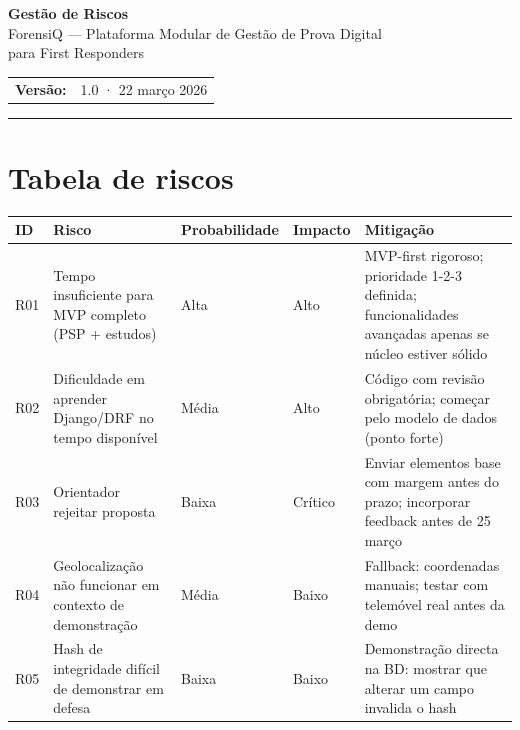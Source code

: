 \documentclass[a4paper,11pt]{article}
\begin{document}

\begin{center}
    {\LARGE\bfseries Gestão de Riscos}\\[0.8em]
    {\large ForensiQ --- Plataforma Modular de Gestão de Prova Digital\\
    para First Responders}\\[1.2em]
    \begin{tabular}{ll}
        \textbf{Versão:} & 1.0 · 22 março 2026 \\
    \end{tabular}
\end{center}

\vspace{0.5em}
\hrule
\vspace{1.5em}

\section{Tabela de riscos}

\begin{longtable}{L{0.8cm} L{4.5cm} L{2.2cm} L{1.8cm} L{5.5cm}}
    \toprule
    \textbf{ID} & \textbf{Risco} & \textbf{Probabili\-dade} & \textbf{Impacto} & \textbf{Mitigação} \\
    \midrule
    \endhead
    R01
        & Tempo insuficiente para MVP completo (PSP + estudos)
        & Alta
        & Alto
        & MVP-first rigoroso; prioridade 1-2-3 definida; funcionalidades avançadas apenas se núcleo estiver sólido \\[0.6em]
    R02
        & Dificuldade em aprender Django/DRF no tempo disponível
        & Média
        & Alto
        & Código com revisão obrigatória; começar pelo modelo de dados (ponto forte) \\[0.6em]
    R03
        & Orientador rejeitar proposta
        & Baixa
        & Crítico
        & Enviar elementos base com margem antes do prazo; incorporar feedback antes de 25 março \\[0.6em]
    R04
        & Geolocalização não funcionar em contexto de demonstração
        & Média
        & Baixo
        & Fallback: coordenadas manuais; testar com telemóvel real antes da demo \\[0.6em]
    R05
        & Hash de integridade difícil de demonstrar em defesa
        & Baixa
        & Baixo
        & Demonstração directa na BD: mostrar que alterar um campo invalida o hash \\
    \bottomrule
\end{longtable}
\end{document}
